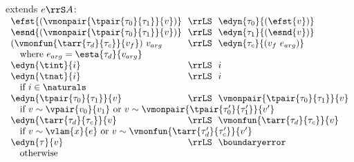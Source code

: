 \begin{flushleft}
\begin{minipage}[t]{\columnwidth}
 extends $e \rrS A$:\\
$\begin{array}{l@{~~}c@{~~}l}
  \efst{(\vmonpair{\tpair{\tau_0}{\tau_1}}{v})} & \rrLS & \edyn{\tau_0}{(\efst{v})}
\\
  \esnd{(\vmonpair{\tpair{\tau_0}{\tau_1}}{v})} & \rrLS & \edyn{\tau_1}{(\esnd{v})}
\\
  (\vmonfun{\tarr{\tau_d}{\tau_c}}{v_f})~v_{arg} & \rrLS & \edyn{\tau_c}{(v_f~e_{arg})}
\\ \multicolumn{3}{l}{\mbox{\quad where $e_{arg} = \esta{\tau_d}{v_{arg}}$}}
\\
  \edyn{\tint}{i} & \rrLS & i
\\
  \edyn{\tnat}{i} & \rrLS & i
\\ \multicolumn{3}{l}{\mbox{\quad if $i \in \naturals$}}
\\
  \edyn{\tpair{\tau_0}{\tau_1}}{v} & \rrLS & \vmonpair{\tpair{\tau_0}{\tau_1}}{v}
\\ \multicolumn{3}{l}{\mbox{\quad if $v \sim \vpair{v_0}{v_1}$ or $v \sim \vmonpair{\tpair{\tau_0'}{\tau_1'}}{v'}$}}
\\
  \edyn{\tarr{\tau_d}{\tau_c}}{v} & \rrLS & \vmonfun{\tarr{\tau_d}{\tau_c}}{v}
\\ \multicolumn{3}{l}{\mbox{\quad if $v \sim \vlam{x}{e}$ or $v \sim \vmonfun{\tarr{\tau_d'}{\tau_c'}}{v'}$}}
\\
  \edyn{\tau}{v} & \rrLS & \boundaryerror
\\ \multicolumn{3}{l}{\mbox{\quad otherwise}}
\end{array}$
\end{minipage}

\end{flushleft}
